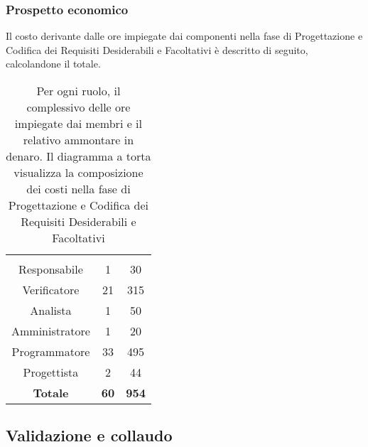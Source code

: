 \subsubsection{Prospetto economico}
Il costo derivante dalle ore impiegate dai componenti nella fase di Progettazione e Codifica dei Requisiti Desiderabili e Facoltativi è descritto di seguito, calcolandone il totale.

\begin{table}[H]
	{\setlength{\parindent}{0cm}
		\begin{minipage}{.43\textwidth}
			\begin{tabular}{ccc}
				\rowcolorhead
				\headertitle{Ruolo} & \headertitle{Ore} & \headertitle{Costo(€)}\\
				Responsabile & 1 & 30\\
				Verificatore & 21 & 315\\
				Analista & 1 & 50\\
				Amministratore & 1 & 20\\
				Programmatore & 33 & 495\\
				Progettista & 2 & 44\\
				\hline
				\textbf{Totale} & \textbf{60} & \textbf{954}\\
			\end{tabular}
		\end{minipage}%
		\begin{minipage}{.57\textwidth}
	\end{minipage} }
	\caption[Prospetto economico della fase di Progettazione e Codifica dei Requisiti Desiderabili e Facoltativi]{Per ogni ruolo, il complessivo delle ore impiegate dai membri e il relativo ammontare in denaro. Il diagramma a torta visualizza la composizione dei costi nella fase di Progettazione e Codifica dei Requisiti Desiderabili e Facoltativi}
\end{table}


\subsection{Validazione e collaudo}

